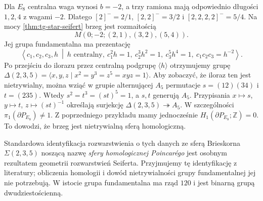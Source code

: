 \begin{center}
\end{center}

\begin{przyklad}
\label{ex:tg-seifert-E8}
Dla $E_8$ centralna waga wynosi $b=-2$,
a trzy ramiona mają odpowiednio długości $1,2,4$
z wagami $-2$. Dlatego
$[2]^-=2/1$, $[2,2]^-=3/2$ i
$[2,2,2,2]^-=5/4$. Na mocy
\ref{thm:tg-star-seifert} brzeg jest rozmaitością
\[
M(0;-2;(2,1),(3,2),(5,4)).
\]
Jej grupa fundamentalna ma prezentację
\[
\left\langle c_1,c_2,c_3,h\ \middle|\
h\text{ centralny},\ c_1^2h=1,\ c_2^3h^2=1,
\ c_3^5h^4=1,\ c_1c_2c_3=h^{-2}\right\rangle.
\]
Po przejściu do ilorazu przez centralną podgrupę
$\langle h\rangle$ otrzymujemy grupę
$\Delta(2,3,5)=\langle x,y,z\mid x^2=y^3=z^5=xyz=1\rangle$.
Aby zobaczyć, że iloraz ten jest nietrywialny,
można wziąć w grupie alternującej $A_5$ permutacje
$s=(12)(34)$ i $t=(235)$. Wtedy $s^2=t^3=(st)^5=1$,
a $s,t$ generują $A_5$. Przypisania
$x\mapsto s$, $y\mapsto t$, $z\mapsto(st)^{-1}$
określają surjekcję $\Delta(2,3,5)\twoheadrightarrow A_5$.
W szczególności $\pi_1(\partial P_{E_8})\ne1$.
Z poprzedniego przykładu mamy jednocześnie
$H_1(\partial P_{E_8};\mathbb Z)=0$.
To dowodzi, że brzeg jest nietrywialną sferą homologiczną.

Standardowa identyfikacja rozwarstwienia o tych danych
ze sferą Brieskorna $\Sigma(2,3,5)$ noszącą nazwę
\emph{sfery homologicznej Poincarégo} jest osobnym
rezultatem geometrii rozwarstwień Seiferta. Przyjmujemy
tę identyfikację z literatury; obliczenia homologii i
dowód nietrywialności grupy fundamentalnej jej nie
potrzebują. W istocie grupa fundamentalna ma rząd $120$
i jest binarną grupą dwudziestościenną.
\end{przyklad}


